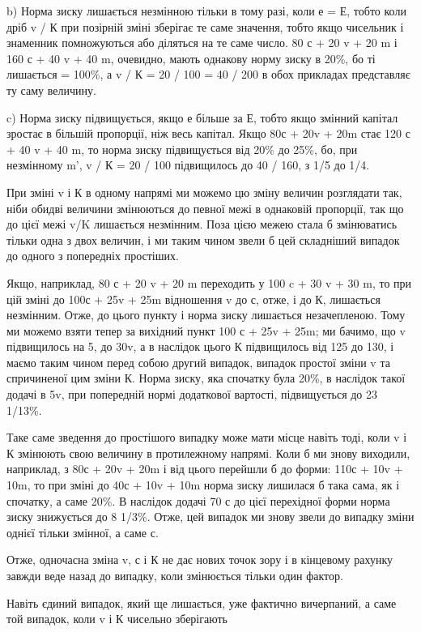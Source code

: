 b) Норма зиску лишається незмінною тільки в тому разі, коли
е = Е, тобто коли дріб v / К при позірній зміні зберігає те саме
значення, тобто якщо чисельник і знаменник помножуються або
діляться на те саме число. 80 с + 20 v + 20 m і 160 с + 40 v + 40 m,
очевидно, мають однакову норму зиску в 20\%, бо ті лишається
= 100\%, а v / К = 20 / 100 = 40 / 200 в обох прикладах представляє
ту саму величину.

c) Норма зиску підвищується, якщо е більше за Е, тобто
якщо змінний капітал зростає в більшій пропорції, ніж весь капітал.
Якщо 80с + 20v + 20m стає 120 с + 40 v + 40 m, то норма
зиску підвищується від 20\% до 25\%, бо, при незмінному m',
v / К = 20 / 100 підвищилось до 40 / 160, з 1/5 до 1/4.

При зміні v і К в одному напрямі ми можемо цю зміну величин
розглядати так, ніби обидві величини змінюються до певної
межі в однаковій пропорції, так що до цієї межі v/K лишається
незмінним. Поза цією межею стала б змінюватись тільки
одна з двох величин, і ми таким чином звели б цей складніший
випадок до одного з попередніх простіших.

Якщо, наприклад, 80 с + 20 v + 20 m переходить у 100 c +
30 v + 30 m, то при цій зміні до 100с + 25v + 25m відношення
v до с, отже, і до К, лишається незмінним. Отже, до цього
пункту і норма зиску лишається незачепленою. Тому ми можемо
взяти тепер за вихідний пункт 100 с + 25v + 25m; ми бачимо,
що v підвищилось на 5, до 30v, а в наслідок цього К підвищилось
від 125 до 130, і маємо таким чином перед собою другий
випадок, випадок простої зміни v та спричиненої цим
зміни К. Норма зиску, яка спочатку була 20\%, в наслідок такої
додачі в 5v, при попередній нормі додаткової вартості, підвищується
до 23 1/13\%.

Таке саме зведення до простішого випадку може мати місце
навіть тоді, коли v і К змінюють свою величину в протилежному
напрямі. Коли б ми знову виходили, наприклад, з 80с + 20v +
20m і від цього перейшли б до форми: 110с + 10v + 10m, то
при зміні до 40с + 10v + 10m норма зиску лишилася б така
сама, як і спочатку, а саме 20\%. В наслідок додачі 70 с до цієї
перехідної форми норма зиску знижується до 8 1/3\%. Отже, цей
випадок ми знову звели до випадку зміни однієї тільки змінної,
а саме с.

Отже, одночасна зміна v, с і К не дає нових точок зору і в
кінцевому рахунку завжди веде назад до випадку, коли змінюється
тільки один фактор.

Навіть єдиний випадок, який ще лишається, уже фактично
вичерпаний, а саме той випадок, коли v і К чисельно зберігають
\parbreak{}  %

